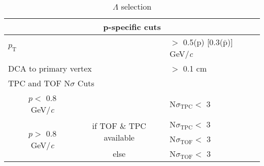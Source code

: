 \documentclass[ALICE,manyauthors]{cernphprep}
\newcommand{\Lam}{$\Lambda$\xspace}
\begin{document}
\begin{table}[htbp]
\begin{tabular}{lc|c|l}
   
   \multicolumn{4}{c}{\textbf{p-specific cuts}} \\
   \hline
   \multicolumn{3}{l|}{$p_{\mathrm{T}}$} & $ > $ 0.5(p) [0.3($\bar{\mathrm{p}}$)] GeV/\textit{c} \\
   \hline
   \multicolumn{3}{l|}{DCA to primary vertex} & $>$ 0.1 cm \\
   \hline
   \multicolumn{4}{l}{TPC and TOF N$\sigma$ Cuts} \\
   \cline{2-4}
    & \multicolumn{1}{c}{$p <$ 0.8 GeV/\textit{c}} & & N$\sigma_{\mathrm{TPC}} <$ 3 \\
   \cline{2-4}
    & \multicolumn{1}{c}{\multirow{3}{*}{$p >$ 0.8 GeV/\textit{c}}} &  \multirow{2}{*}{if TOF \& TPC available} & N$\sigma_{\mathrm{TPC}} <$ 3 \\
    & \multicolumn{2}{c|}{} & N$\sigma_{\mathrm{TOF}} <$ 3 \\
   \cline{3-4}
    & \multicolumn{1}{c}{} & else & N$\sigma_{\mathrm{TOF}} <$ 3 \\
   \hline   
  \end{tabular}
 \caption{\Lam selection}
 \label{tab:LamCuts} 
\end{table}
\end{document}
